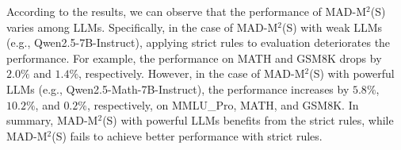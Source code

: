 \documentclass{article} %
\newcommand{\methodname}{MAD-M$^2$}
\theoremstyle{plain}
\begin{document}
According to the results, we can observe that the performance of \methodname (S) varies among LLMs. Specifically, in the case of \methodname (S) with weak LLMs (e.g., Qwen2.5-7B-Instruct), applying strict rules to evaluation deteriorates the performance. For example, the performance on MATH and GSM8K drops by $2.0\%$ and $1.4\%$, respectively. However, in the case of \methodname (S) with powerful LLMs (e.g., Qwen2.5-Math-7B-Instruct), the performance increases by $5.8\%$, $10.2\%$, and $0.2\%$, respectively, on MMLU\_Pro, MATH, and GSM8K. In summary, \methodname (S) with powerful LLMs benefits from the strict rules, while \methodname (S) fails to achieve better performance with strict rules.


\end{document}
